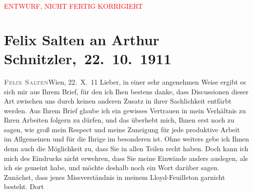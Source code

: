 
\begin{center}
            \textcolor{red}{ENTWURF, NICHT FERTIG KORRIGIERT}
                      \end{center}
            
         
         \renewcommand{\erwaehntePersonen}{Personen: Ottilie Salten, Olga Schnitzler}
         \renewcommand{\erwaehnteOrte}{Orte: Berlin, Wien}
         \renewcommand{\erwaehnteWerke}{Werke: Burgtheater. »Das weite Land.« Tragikomödie von Arthur Schnitzler, Das weite Land. Tragikomödie in fünf Akten, Der gute König Dagobert. Lustspiel in vier Aufzügen}
               \section[ Felix Salten an Arthur Schnitzler, 22. 10. 1911]{ Felix Salten an Arthur Schnitzler, 22. 10. 1911}\nopagebreak{}\rehead{ }\begin{ledgroupsized}[t]{13cm}\normalsize\beginnumbering \toendnotes[C]{\smallbreak\pagebreak[2]} 
\toendnotes[C]{\smallbreak}\pstart
           \noindent{}{\pb}\textcolor{gray}{\textbf{\textsc{Felix Salten}}}\hfill Wien, 22. X. 11\pend
           \pstart
           Lieber, in einer sehr angenehmen Weise ergibt es sich mir aus Ihrem
               Brief, für den ich Ihen bestens danke, dass Discussionen dieser Art zwischen uns
               durch keinen anderen Zusatz in ihrer Sachlichkeit entfärbt werden. Aus Ihrem Brief
               glaube ich ein gewisses Vertrauen in mein Verhältnis zu Ihren Arbeiten folgern zu
               dürfen, und das überhebt mich, Ihnen erst noch zu sagen, wie groß mein Respect und
               meine Zuneigung für jede produktive Arbeit im Allgemeinen und für die Ihrige im
               besonderen ist. Ohne weiters gebe ich Ihnen denn auch die Möglichkeit zu, dass Sie in
               allen Teilen recht haben. Doch kann ich mich des Eindrucks nicht erwehren, dass Sie
               meine Einwände anders auslegen, als ich sie gemeint habe, und möchte deshalb noch ein
               Wort darüber sagen. Zunächst, dass jenes Missverständnis in meinem Lloyd-Feuilleton garnicht besteht. Dort

\end{ledgroupsized}
